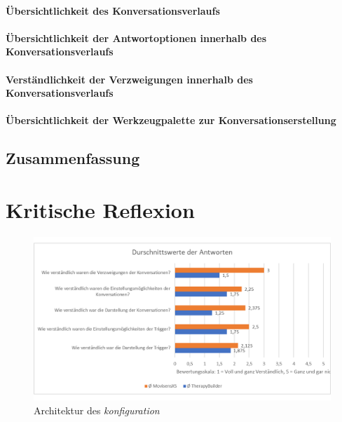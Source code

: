 \paragraph{Übersichtlichkeit des Konversationsverlaufs}
\paragraph{Übersichtlichkeit der Antwortoptionen innerhalb des Konversationsverlaufs}
\paragraph{Verständlichkeit der Verzweigungen innerhalb des Konversationsverlaufs}
\paragraph{Übersichtlichkeit der Werkzeugpalette zur Konversationserstellung}




\subsection{Zusammenfassung}

\section{Kritische Reflexion}

\begin{figure}[h]
\centering
\includegraphics[width=1\textwidth]{pictures/diagramme/antwortendurchsch1}
\caption{Architektur des \emph{konfiguration}}
\label{antwortendurchsch1}
\end{figure}

